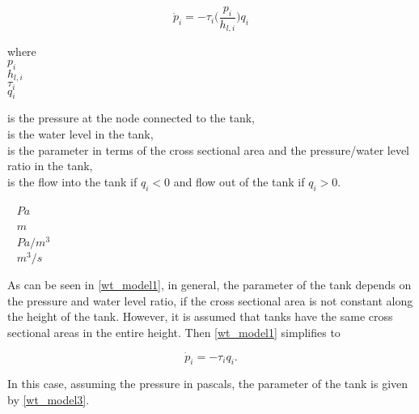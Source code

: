 \begin{equation}
\label{wt_model1}
\dot{p}_i = -\tau_i\Big(\frac{p_i}{h_{l,i}}\Big) q_i
\end{equation}

 \begin{minipage}[t]{0.20\textwidth}
where\\
\hspace*{8mm} $p_i$ \\
\hspace*{8mm} $h_{l,i}$ \\
\hspace*{8mm} $\tau_i$ \\
\newline
\hspace*{8mm} $q_i$ 
\end{minipage}
\begin{minipage}[t]{0.63\textwidth}
\vspace*{2mm}
is the pressure at the node connected to the tank,\\ 
is the water level in the tank,\\ 
is the parameter in terms of the cross sectional area and the pressure/water level ratio in the tank,\\
is the flow into the tank if $q_i < 0$ and flow out of the tank if $q_i > 0$.
\end{minipage}
\begin{minipage}[t]{0.15\textwidth}
\vspace*{2mm}
\textcolor{White}{te}$\unit{Pa}$\\
\textcolor{White}{te}$\unit{m}$\\
\textcolor{White}{te}$\unit{Pa/m^3}$\\
\newline
\textcolor{White}{te}$\unit{m^3/s}$
\end{minipage} 

As can be seen in \eqref{wt_model1}, in general, the parameter of the tank depends on the pressure and water level ratio, if the cross sectional area is not constant along the height of the tank. However, it is assumed that tanks have the same cross sectional areas in the entire height. Then \eqref{wt_model1} simplifies to

\begin{equation}
\label{wt_model2}
\dot{p}_i = -\tau_i q_i.
\end{equation}

In this case, assuming the pressure in pascals, the parameter of the tank is given by \eqref{wt_model3}.

